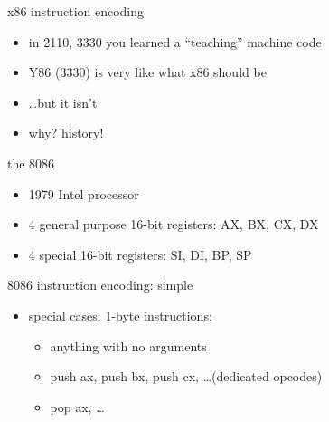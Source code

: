 \usetikzlibrary{chains}

\begin{frame}{x86 instruction encoding}
\begin{itemize}
    \item in 2110, 3330 you learned a ``teaching'' machine code
    \item Y86 (3330) is very like what x86 should be
    \item \ldots but it isn't
    \item why? history!
\end{itemize}
\end{frame}

\begin{frame}{the 8086}
\begin{itemize}
    \item 1979 Intel processor
    \item 4 general purpose 16-bit registers: AX, BX, CX, DX
    \item 4 special 16-bit registers: SI, DI, BP, SP
\end{itemize}
\end{frame}

\begin{frame}{8086 instruction encoding: simple}
\begin{itemize}
    \item special cases: 1-byte instructions:
    \begin{itemize}
    \item anything with no arguments
    \item push ax, push bx, push cx, \ldots (dedicated opcodes)
    \item pop ax, \ldots
    \end{itemize}
\end{itemize}
\end{frame}

